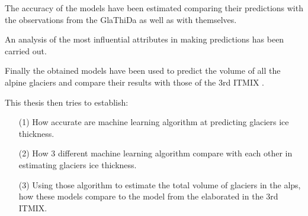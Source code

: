 The accuracy of the models have been estimated comparing their predictions with the observations from the GlaThiDa as well as with themselves.

An analysis of the most influential attributes in making predictions has been carried out.

Finally the obtained models have been used to predict the volume of all the alpine glaciers and compare their results with those of the 3rd ITMIX \cite{Farinotti2019}.


This thesis then tries to establish:
\begin{itemize}
\item[(1)] How accurate are machine learning algorithm at predicting glaciers ice thickness.
\item[(2)] How 3 different machine learning algorithm compare with each other in estimating glaciers ice thickness.
\item[(3)] Using those algorithm to estimate the total volume of glaciers in the alps, how these models compare to the model from the \cite{Farinotti2019} elaborated in the 3rd ITMIX.
\end{itemize}

%
%
